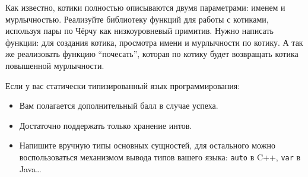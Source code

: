 \documentclass{article}
\begin{document}
    Как известно, котики полностью описываются двумя параметрами: именем и мурлычностью.
    Реализуйте библиотеку функций для работы с котиками, используя пары по Чёрчу как низкоуровневый примитив.
    Нужно написать функции: для создания котика, просмотра имени и мурлычности по котику.
    А так же реализовать функцию ``почесать'', которая по котику будет возвращать котика повышенной мурлычности.

    Если у вас статически типизированный язык программирования:
    \begin{itemize}
        \item Вам полагается дополнительный балл в случае успеха.
        \item Достаточно поддержать только хранение интов.
        \item Напишите вручную типы основных сущностей, для остального можно воспользоваться механизмом вывода типов вашего языка: \texttt{auto} в C++, \texttt{var} в Java\ldots
    \end{itemize}
\end{document}
